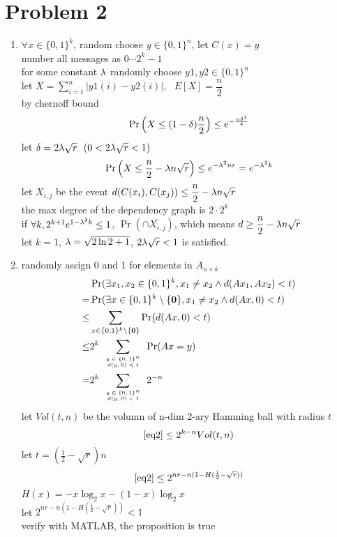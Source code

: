 \documentclass[12pt]{article}
\begin{document}
\section*{Problem 2}
\begin{enumerate}
\item
$\forall x\in\{0,1\}^k$, random choose $y\in\{0,1\}^n$, let $C(x)=y$\\
number all messages as $0\cdots 2^{k}-1$\\
for some constant $\lambda$
randomly choose $y1,y2\in \{0,1\}^n$\\
let $X=\sum_{i=1}^{n}|y1(i)-y2(i)|, ~~~E[X]=\dfrac{n}{2}$\\
by chernoff bound\\
$$\Pr\left(X\leq(1-\delta)\frac{n}{2}\right)\leq e^{-\frac{n\delta^2}{4}}$$
let $\delta=2\lambda\sqrt{r}~~(0<2\lambda\sqrt{r}<1)$\\
$$\Pr\left(X\leq \frac{n}{2}-\lambda n\sqrt{r}\right)\leq e^{-\lambda^2nr}=e^{-\lambda^2k}$$
let
$X_{i,j}$ be the event $d(C(x_i),C(x_j))\leq\dfrac{n}{2}-\lambda n\sqrt{r}$\\
the max degree of the dependency graph is $2\cdot 2^k$\\
if $\forall k, 2^{k+1}e^{1-\lambda^2k}\leq 1$, $\Pr(\cap\overline{X_{i,j}})$, which means $d\geq \dfrac{n}{2}-\lambda n\sqrt{r}$\\
let $k=1$, $\lambda=\sqrt{2\ln2+1}$, $2\lambda\sqrt{r}<1$ is satisfied.
\item
randomly assign $0$ and $1$ for elements in $A_{n\times k}$\\
\begin{equation}\label{eq2}
\begin{aligned}
&\Pr(\exists x_1,x_2\in \{0,1\}^k, x_1\neq x_2 \wedge d(Ax_1, Ax_2)<t)\\
=&\Pr(\exists x\in\{0,1\}^k\setminus\{\mathbf{0}\}, x_1\neq x_2 \wedge d(Ax,0 )<t)\\
\leq&\sum_{x\in\{0,1\}^k\setminus\{\mathbf{0}\}}\Pr(d(Ax,0)<t)\\
\leq&2^k\sum_{\mbox{\tiny$\begin{array}{c}
y\in \{0,1\}^n\\
d(y,0)<t\\
\end{array}$}}\Pr(Ax=y)\\
=&2^k\sum_{\mbox{\tiny$\begin{array}{c}
y\in \{0,1\}^n\\
d(y,0)<t\\
\end{array}$}}2^{-n}
\end{aligned}
\end{equation}
let $Vol(t,n)$ be the volumn of n-dim 2-ary Hamming ball with radius $t$\\
$$\eqref{eq2}\leq 2^{k-n}Vol(t,n)$$
let $t=(\frac{1}{2}-\sqrt{r})n$
$$\eqref{eq2}\leq 2^{nr-n(1-H(\frac{1}{2}-\sqrt{r}))}$$
$H(x)=-x\log_2x-(1-x)\log_2x$\\
let $2^{nr-n(1-H(\frac{1}{2}-\sqrt{r}))}<1$\\
verify with MATLAB, the proposition is true\\
\end{enumerate}
\end{document}
